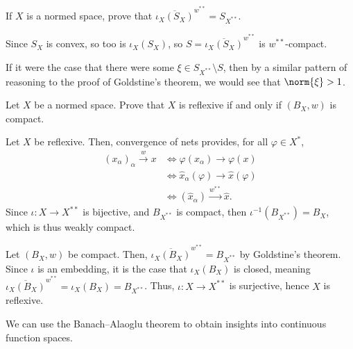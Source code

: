 \documentclass[10pt]{mypackage}
\begin{document}
\begin{exercise}
  If $X$ is a normed space, prove that $\overline{\iota_{X}\left(S_X\right)}^{w^{\ast\ast}} = S_{X^{\ast\ast}}$.
\end{exercise}
\begin{solution}
  Since $S_X$ is convex, so too is $\iota_{X}\left(S_X\right)$, so $S = \overline{\iota_{X}\left(S_X\right)}^{w^{\ast\ast}}$ is $w^{\ast\ast}$-compact.\newline

  If it were the case that there were some $\xi\in  S_{X^{\ast\ast}}\setminus S$, then by a similar pattern of reasoning to the proof of Goldstine's theorem, we would see that $\norm{\xi} > 1$.
\end{solution}
\begin{exercise}
  Let $X$ be a normed space. Prove that $X$ is reflexive if and only if $\left(B_X,w\right)$ is compact.
\end{exercise}
\begin{solution}[]
  Let $X$ be reflexive. Then, convergence of nets provides, for all $\varphi\in X^{\ast}$,
  \begin{align*}
    \left(x_{\alpha}\right)_{\alpha}\xrightarrow{w} x &\Leftrightarrow \varphi\left(x_{\alpha}\right) \rightarrow \varphi\left(x\right)\\
                                                      &\Leftrightarrow \hat{x}_{\alpha}\left(\varphi\right) \rightarrow \hat{x}\left(\varphi\right)\\
                                                      &\Leftrightarrow \left(\hat{x}_{\alpha}\right)\xrightarrow{w^{\ast\ast}}\hat{x}.
  \end{align*}
  Since $\iota: X\rightarrow X^{\ast\ast}$ is bijective, and $B_{X^{\ast\ast}}$ is compact, then $\iota^{-1}\left(B_{X^{\ast\ast}}\right) = B_X$, which is thus weakly compact.\newline

  Let $\left(B_X,w\right)$ be compact. Then, $\overline{\iota_{X}\left(B_X\right)}^{w^{\ast\ast}} = B_{X^{\ast\ast}}$ by Goldstine's theorem. Since $\iota$ is an embedding, it is the case that $\iota_{X}\left(B_X\right)$ is closed, meaning $\overline{\iota_{X}\left(B_X\right)}^{w^{\ast\ast}} = \iota_{X}\left(B_X\right) = B_{X^{\ast\ast}}$. Thus, $\iota: X\rightarrow X^{\ast\ast}$ is surjective, hence $X$ is reflexive.
\end{solution}
We can use the Banach--Alaoglu theorem to obtain insights into continuous function spaces.\newline
\end{document}
